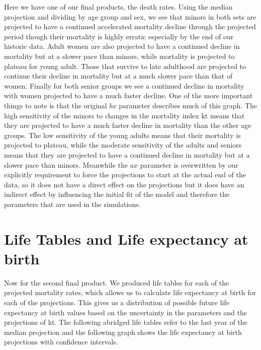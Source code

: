 \documentclass[
  12pt,
]{report}
\begin{document}
Here we have one of our final products, the death rates. Using the
median projection and dividing by age group and sex, we see that minors
in both sets are projected to have a continued accelerated mortality
decline through the projected period though their mortality is highly
erratic especially by the end of our historic data. Adult women are also
projected to have a continued decline in mortality but at a slower pace
than minors, while mortality is projected to plateau for young adult.
Those that survive to late adulthood are projected to continue their
decline in mortality but at a much slower pace than that of women.
Finally for both senior groups we see a continued decline in mortality
with women projected to have a much faster decline. One of the more
important things to note is that the original \(bx\) parameter describes
much of this graph. The high sensitivity of the minors to changes in the
mortality index kt means that they are projected to have a much faster
decline in mortality than the other age groups. The low sensitivity of
the young adults means that their mortality is projected to plateau,
while the moderate sensitivity of the adults and seniors means that they
are projected to have a continued decline in mortality but at a slower
pace than minors. Meanwhile the \(ax\) parameter is overwritten by our
explicitly requirement to force the projections to start at the actual
end of the data, so it does not have a direct effect on the projections
but it does have an indirect effect by influencing the initial fit of
the model and therefore the parameters that are used in the simulations.

\section{Life Tables and Life expectancy at
birth}\label{life-tables-and-life-expectancy-at-birth}

Now for the second final product. We produced life tables for each of
the projected mortality rates, which allows us to calculate life
expectancy at birth for each of the projections. This gives us a
distribution of possible future life expectancy at birth values based on
the uncertainty in the parameters and the projections of kt. The
following abridged life tables refer to the last year of the median
projection and the following graph shows the life expectancy at birth
projections with confidence intervals.

\begingroup\fontsize{10}{12}\selectfont
\end{document}
